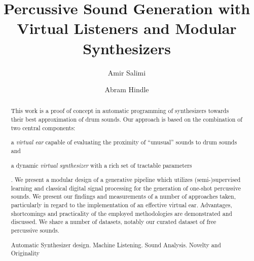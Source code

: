 \documentclass[runningheads,a4paper]{llncs}
\newcommand{\keywords}[1]{\par\addvspace\baselineskip
\noindent\keywordname\enspace\ignorespaces#1}
\begin{document}
\mainmatter  

\title{Percussive Sound Generation with Virtual Listeners and Modular Synthesizers}


\author{Amir Salimi \and Abram Hindle}



\maketitle
\begin{abstract}
This work is a proof of concept in automatic programming of synthesizers towards their best approximation of drum sounds. Our approach is based on the combination of two central components: \begin {enumerate*} [label=(\roman*)] \item a \emph{virtual ear} capable of evaluating the proximity of \enquote{unusual} sounds to drum sounds and \item a dynamic \emph{virtual synthesizer} with a rich set of tractable parameters\end{enumerate*}. We present a modular design of a generative pipeline which utilizes (semi-)supervised learning and classical digital signal processing for the generation of one-shot percussive sounds. We present our findings and measurements of a number of approaches taken, particularly in regard to the implementation of an effective virtual ear. Advantages, shortcomings and practicality of the employed methodologies are demonstrated and discussed. We share a number of datasets, notably our curated dataset of free percussive sounds.

\keywords{Automatic Synthesizer design. Machine Listening. Sound Analysis. Novelty and Originality}
\end{abstract}
\end{document}
